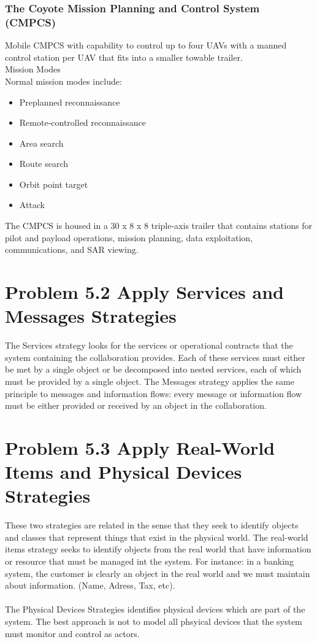 \documentclass[12pt,a4paper]{article}
\begin{document}
\subsubsection{The Coyote Mission Planning and Control System (CMPCS)}
Mobile CMPCS with capability to control up to four UAVs with a manned
control station per UAV that fits into a smaller towable trailer. \\

Mission Modes \\
Normal mission modes include:

\begin{itemize}
\item Preplanned reconnaissance
\item Remote-controlled reconnaissance
\item Area search
\item Route search
\item Orbit point target
\item Attack
\end{itemize}

The CMPCS is housed in a 30 x 8 x 8 triple-axis trailer that contains
stations for pilot and payload operations, mission planning, data exploitation,
communications, and SAR viewing.

\section{Problem 5.2 Apply Services and Messages Strategies}
The Services strategy looks for the services or operational contracts that the system
containing the collaboration provides. Each of these services must either be met by
a single object or be decomposed into nested services, each of which must be provided by a single object. The Messages strategy applies the same principle to messages and information flows: every message or information flow must be either provided or received by an object in the collaboration.

\section{Problem 5.3 Apply Real-World Items and Physical Devices Strategies}
These two strategies are related in the sense that they seek to identify objects and
classes that represent things that exist in the physical world. The real-world items strategy seeks to identify objects from the real world that have information or resource that must be managed int the system. For instance: in a banking system, the customer is clearly an object in the real world and we must maintain about information. (Name, Adress, Tax, etc).
 \\ \\
The Physical Devices Strategies identifies physical devices which are part of the system. The best approach is not to model all phsyical devices that the system must monitor and control as actors.
\end{document}
